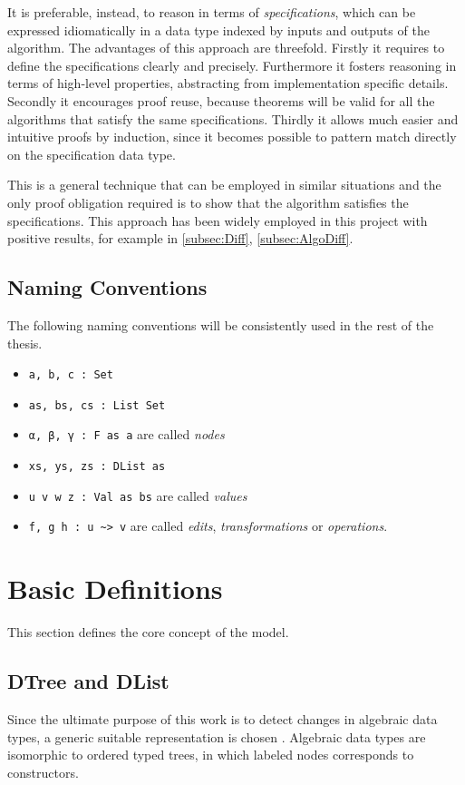 \documentclass[../Thesis.tex]{subfiles}
\begin{document}
	It is preferable, instead, to reason in terms of \emph{specifications}, which
	can be expressed idiomatically in a data type indexed by inputs
	and outputs of the algorithm. 
	The advantages of this approach are threefold.
	Firstly it requires to define the specifications clearly and precisely.
	Furthermore it fosters 	reasoning in terms of high-level properties, 
	abstracting from implementation specific details.
	Secondly it encourages proof reuse, because theorems will be valid for
	all the algorithms that satisfy the same specifications.
	Thirdly it allows much easier and intuitive proofs by induction, since it 
	becomes possible to pattern match directly on the specification data type.
	
	This is a general technique that can be employed in similar situations and 
	the only proof obligation required is to show that the algorithm satisfies the
	specifications.
	This approach has been widely employed in this project with positive 
	results,	 for example in \ref{subsec:Diff}, \ref{subsec:AlgoDiff}. 
	
	\subsection{Naming Conventions}
	The following naming conventions will be consistently used in the rest of  
	the thesis. 
	\begin{itemize}
		\item \texttt{a, b, c :\ Set}
		\item \texttt{as, bs, cs :\ List Set}
		\item \texttt{α, β, γ :\ F as a} are called \emph{nodes}
		\item \texttt{xs, ys, zs :\ DList as} 
		\item \texttt{u v w z :\ Val as bs} are called \emph{values}
		\item \texttt{f, g h :\ u \textasciitilde> v} are called  \emph{edits},
		\emph{transformations} or \emph{operations}.
	\end{itemize}

\section{Basic Definitions}
This section defines the core concept of the model.

	\subsection{DTree and DList}
		Since the ultimate purpose of this work is to detect changes in 
		algebraic data types, a generic suitable representation is chosen .
		Algebraic data types are isomorphic to ordered typed trees, in which 
		labeled nodes corresponds to constructors.
\end{document}
